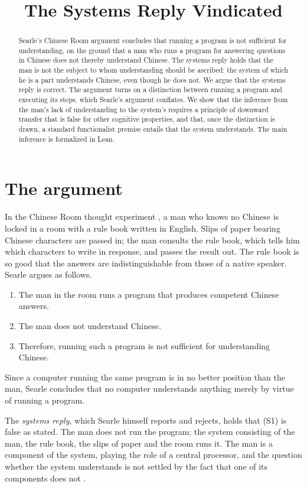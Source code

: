 \documentclass{situationist-preprint}
\title{The Systems Reply Vindicated}
\begin{document}
\maketitle

\begin{abstract}
Searle's Chinese Room argument concludes that running a program is not sufficient for understanding, on the ground that a man who runs a program for answering questions in Chinese does not thereby understand Chinese. The systems reply holds that the man is not the subject to whom understanding should be ascribed: the system of which he is a part understands Chinese, even though he does not. We argue that the systems reply is correct. The argument turns on a distinction between running a program and executing its steps, which Searle's argument conflates. We show that the inference from the man's lack of understanding to the system's requires a principle of downward transfer that is false for other cognitive properties, and that, once the distinction is drawn, a standard functionalist premise entails that the system understands. The main inference is formalized in Lean.
\end{abstract}

\section{The argument}

In the Chinese Room thought experiment \citep{Searle1980}, a man who knows no Chinese is locked in a room with a rule book written in English. Slips of paper bearing Chinese characters are passed in; the man consults the rule book, which tells him which characters to write in response, and passes the result out. The rule book is so good that the answers are indistinguishable from those of a native speaker. Searle argues as follows.
\begin{enumerate}[label=(S\arabic*)]
\item The man in the room runs a program that produces competent Chinese answers.
\item The man does not understand Chinese.
\item Therefore, running such a program is not sufficient for understanding Chinese.
\end{enumerate}
Since a computer running the same program is in no better position than the man, Searle concludes that no computer understands anything merely by virtue of running a program.

The \emph{systems reply}, which Searle himself reports and rejects, holds that (S1) is false as stated. The man does not run the program; the system consisting of the man, the rule book, the slips of paper and the room runs it. The man is a component of the system, playing the role of a central processor, and the question whether the system understands is not settled by the fact that one of its components does not \citep{Copeland1993}.
\end{document}
